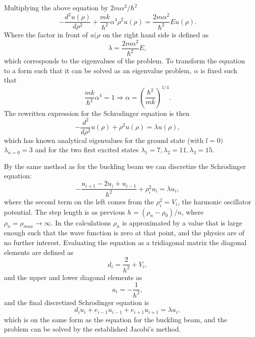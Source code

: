 \documentclass{emulateapj}
\begin{document}
%
Multiplying the above equation by $2m\alpha^2 / \hbar^2$
%
\begin{equation*}
    -\frac{d^2u(\rho)}{d\rho^2} + \frac{mk}{\hbar^2}\alpha^4 \rho^2u(\rho) = \frac{2m\alpha^2}{\hbar^2}Eu(\rho).
\end{equation*}
%
Where the factor in front of $u(\rho$ on the right hand side is defined as
%
\begin{equation*}
    \lambda = \frac{2m\alpha^2}{\hbar^2}E,
\end{equation*}
%
which corresponds to the eigenvalues of the problem. To transform the equation to a form such that it can be solved as an eigenvalue problem, $\alpha$ is fixed such that
%
\begin{equation*}
    \frac{mk}{\hbar^2}\alpha^4 = 1
    \Rightarrow \alpha = \left(\frac{\hbar^2}{mk}\right)^{1/4}.
\end{equation*}
%
The rewritten expression for the Schr$\ddot{\mathrm{o}}$dinger equation is then
%
\begin{equation*}
    -\frac{d^2}{d\rho^2}u(\rho) + \rho^2u(\rho) = \lambda u(\rho),
\end{equation*}
%
which has known analytical eigenvalues for the ground state (with $l=0)$ $\lambda_{n=0} = 3$ and for the two first excited states $\lambda_1 = 7, \lambda_2 = 11, \lambda_3 = 15$. 

By the same method as for the buckling beam we can discretize the Schr$\ddot{\mathrm{o}}$dinger equation:
%
\begin{equation*}
    -\frac{u_{i+1} - 2u_i + u_{i-1}}{h^2} + \rho_i^2u_i = \lambda u_i,
\end{equation*}
%
where the second term on the left comes from the $\rho_i^2 = V_i$, the harmonic oscillator potential. The step length is as previous $h = \left(\rho_n - \rho_0\right)/n$, where $\rho_n = \rho_{max} \rightarrow \infty$. In the calculations $\rho_n$ is approximated by a value that is large enough such that the wave function is zero at that point, and the physics are of no further interest. Evaluating the equation as a tridiagonal matrix the diagonal elements are defined as
%
\begin{equation*}
    d_i = \frac{2}{h^2} + V_i,
\end{equation*}
%
and the upper and lower diagonal elements as
%
\begin{equation*}
    a_i = -\frac{1}{h^2},
\end{equation*}
%
and the final discretized Schr$\ddot{\mathrm{o}}$dinger equation is
%
\begin{equation*}
    d_iu_i + e_{i-1}u_{i-1} + e_{i+1}u_{i+1} = \lambda u_i,
\end{equation*}
%
which is on the same form as the equation for the buckling beam, and the problem can be solved by the established Jacobi's method.
\end{document}
